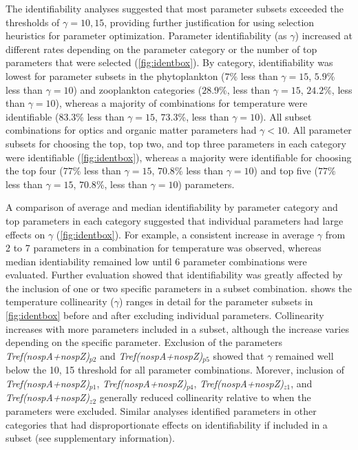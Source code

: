 \documentclass[letterpaper,12pt,oneside]{article}\usepackage[]{graphicx}\usepackage[]{color}
\begin{document}
The identifiability analyses suggested that most parameter subsets exceeded the thresholds of $\gamma = 10, 15$, providing further justification for using selection heuristics for parameter optimization.  Parameter identifiability (as $\gamma$) increased at different rates depending on the parameter category or the number of top parameters that were selected (\cref{fig:identbox}).  By category, identifiability was lowest for parameter subsets in the phytoplankton ($7$\% less than $\gamma = 15$, $5.9$\% less than $\gamma = 10$)  and zooplankton categories ($28.9$\%, less than $\gamma = 15$, $24.2$\%, less than $\gamma = 10$), whereas a majority of combinations for temperature were identifiable ($83.3$\% less than $\gamma = 15$, $73.3$\%, less than $\gamma = 10$).  All subset combinations for optics and organic matter parameters had $\gamma < 10$.  All parameter subsets for choosing the top, top two, and top three parameters in each category were identifiable (\cref{fig:identbox}), whereas a majority were identifiable for choosing the top four ($77$\% less than $\gamma = 15$, $70.8$\% less than $\gamma = 10$) and top five ($77$\% less than $\gamma = 15$, $70.8$\%, less than $\gamma = 10$) parameters.  



A comparison of average and median identifiability by parameter category and top parameters in each category suggested that individual parameters had large effects on $\gamma$ (\cref{fig:identbox}).  For example, a consistent increase in average $\gamma$ from 2 to 7 parameters in a combination for temperature was observed, whereas median identiability remained low until 6 parameter combinations were evaluated.  Further evaluation showed that identifiability was greatly affected by the inclusion of one or two specific parameters in a subset combination.   shows the temperature collinearity ($\gamma$) ranges in detail for the parameter subsets in \cref{fig:identbox} before and after excluding individual parameters.  Collinearity increases with more parameters included in a subset, although the increase varies depending on the specific parameter.  Exclusion of the parameters \textit{Tref(nospA+nospZ)$_{p2}$} and \textit{Tref(nospA+nospZ)$_{p5}$} showed that $\gamma$ remained well below the 10, 15 threshold for all parameter combinations.  Morever, inclusion of \textit{Tref(nospA+nospZ)$_{p1}$}, \textit{Tref(nospA+nospZ)$_{p4}$}, \textit{Tref(nospA+nospZ)$_{z1}$}, and \textit{Tref(nospA+nospZ)$_{z2}$} generally reduced collinearity relative to when the parameters were excluded.  Similar analyses identified parameters in other categories that had disproportionate effects on identifiability if included in a subset (see supplementary information).
\end{document}
